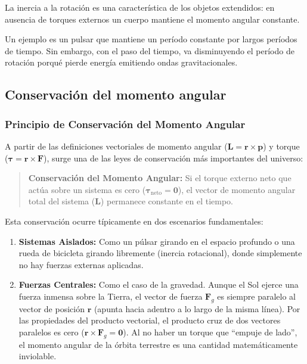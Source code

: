 \documentclass[11pt,a4paper]{book}
\begin{document}
La inercia a la rotación es una característica de los objetos extendidos: en ausencia de torques externos un cuerpo mantiene el momento angular constante.

Un ejemplo es un pulsar que mantiene un período constante por largos períodos de tiempo. Sin embargo, con el paso del tiempo, va disminuyendo el período de rotación porqué pierde energía emitiendo ondas gravitacionales.



\subsection{Conservación del momento angular}
\subsubsection{Principio de Conservación del Momento Angular}

A partir de las definiciones vectoriales de momento angular ($\boldsymbol{L} = \boldsymbol{r} \times \boldsymbol{p}$) y torque ($\boldsymbol{\tau} = \boldsymbol{r} \times \boldsymbol{F}$), surge una de las leyes de conservación más importantes del universo:

\begin{quote}
    \textbf{Conservación del Momento Angular:} Si el torque externo neto que actúa sobre un sistema es cero ($\boldsymbol{\tau}_{\text{neto}} = \boldsymbol{0}$), el vector de momento angular total del sistema ($\boldsymbol{L}$) permanece constante en el tiempo.
\end{quote}

Esta conservación ocurre típicamente en dos escenarios fundamentales:
\begin{enumerate}
    \item \textbf{Sistemas Aislados:} Como un púlsar girando en el espacio profundo o una rueda de bicicleta girando libremente (inercia rotacional), donde simplemente no hay fuerzas externas aplicadas.
    \item \textbf{Fuerzas Centrales:} Como el caso de la gravedad. Aunque el Sol ejerce una fuerza inmensa sobre la Tierra, el vector de fuerza $\boldsymbol{F}_g$ es siempre paralelo al vector de posición $\boldsymbol{r}$ (apunta hacia adentro a lo largo de la misma línea). Por las propiedades del producto vectorial, el producto cruz de dos vectores paralelos es cero ($\boldsymbol{r} \times \boldsymbol{F}_g = \boldsymbol{0}$). Al no haber un torque que ``empuje de lado'', el momento angular de la órbita terrestre es una cantidad matemáticamente inviolable.
\end{enumerate}
\end{document}
